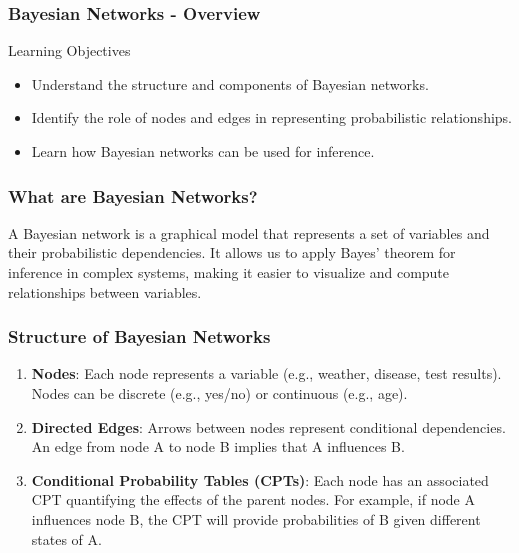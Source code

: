 \documentclass[aspectratio=169]{beamer}
\begin{document}
\begin{frame}[fragile]
    \frametitle{Bayesian Networks - Overview}
    \begin{block}{Learning Objectives}
        \begin{itemize}
            \item Understand the structure and components of Bayesian networks.
            \item Identify the role of nodes and edges in representing probabilistic relationships.
            \item Learn how Bayesian networks can be used for inference.
        \end{itemize}
    \end{block}
\end{frame}

\begin{frame}[fragile]
    \frametitle{What are Bayesian Networks?}
    A Bayesian network is a graphical model that represents a set of variables and their probabilistic dependencies. It allows us to apply Bayes' theorem for inference in complex systems, making it easier to visualize and compute relationships between variables.
\end{frame}

\begin{frame}[fragile]
    \frametitle{Structure of Bayesian Networks}
    \begin{enumerate}
        \item \textbf{Nodes}: Each node represents a variable (e.g., weather, disease, test results). Nodes can be discrete (e.g., yes/no) or continuous (e.g., age).
        \item \textbf{Directed Edges}: Arrows between nodes represent conditional dependencies. An edge from node A to node B implies that A influences B.
        \item \textbf{Conditional Probability Tables (CPTs)}: Each node has an associated CPT quantifying the effects of the parent nodes. For example, if node A influences node B, the CPT will provide probabilities of B given different states of A.
    \end{enumerate}
\end{frame}
\end{document}
